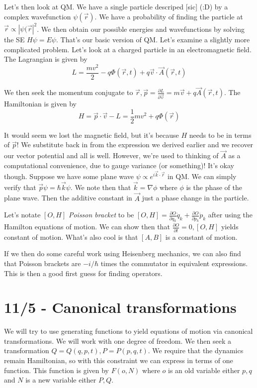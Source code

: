 \documentclass[10pt]{report}
\newcommand{\pd}[2]{\frac{\partial #1}{\partial#2}}
\newcommand{\abs}[1]{\left|#1\right|}
\begin{document}
Let's then look at QM. We have a single particle descriped [sic] (:D) by a complex wavefunction $\psi(\vec{r})$. We have a probability of finding the particle at $\vec{r} \propto \abs{\psi(\vec{r}}^2$. We then obtain our possible energies and wavefunctions by solving the SE $H\psi = E\psi$. That's our basic version of QM. Let's examine a slightly more complicated problem. Let's look at a charged particle in an electromagnetic field. The Lagrangian is given by
$$L = \frac{mv^2}{2} - q \Phi (\vec{r}, t) + q\vec{v} \cdot \vec{A}(\vec{r},t)$$

We then seek the momentum conjugate to $\vec{r}, \vec{p} = \pd{L}{\vec{v}} = m\vec{v} + q\vec{A}(\vec{r},t)$. The Hamiltonian is given by 
$$H = \vec{p} \cdot \vec{v} - L = \frac{1}{2} mv^2 + q\Phi(\vec{r})$$

It would seem we lost the magnetic field, but it's because $H$ needs to be in terms of $\vec{p}$! We substitute back in from the expression we derived earlier and we recover our vector potential and all is well. However, we're used to thinking of $\vec{A}$ as a computational convenience, due to gauge variance (or something)! It's okay though. Suppose we have some plane wave $\psi \propto e^{i\vec{k}\cdot \vec{r}}$ in QM. We can simply verify that $\vec{p}\psi = \hbar \vec{k} \psi$. We note then that $\vec{k} = \nabla \phi$ where $\phi$ is the phase of the plane wave. Then the additive constant in $\vec{A}$ just a phase change in the particle.

Let's notate $\left[ O,H \right]$ \emph{Poisson bracket} to be $\left[ O,H \right] = \pd{O}{q_k}\dot{q}_k + \pd{O}{p_k}\dot{p}_k$ after using the Hamilton equations of motion. We can show then that $\pd{O}{t} = 0, \left[ O,H \right]$ yields constant of motion. What's also cool is that $\left[ A,B \right]$ is a constant of motion. 

If we then do some careful work using Heisenberg mechanics, we can also find that Poisson brackets are $-i/\hbar$ times the commutator in equivalent expressions. This is then a good first guess for finding operators.

\chapter{11/5 - Canonical transformations}

We will try to use generating functions to yield equations of motion via canonical transformations. We will work with one degree of freedom. We then seek a transformation $Q = Q(q,p,t), P=P(p,q,t)$. We require that the dynamics remain Hamiltonian, so with this constraint we can express in terms of one function. This function is given by $F(o,N)$ where $o$ is an old variable either $p,q$ and $N$ is a new variable either $P,Q$.
\end{document}
